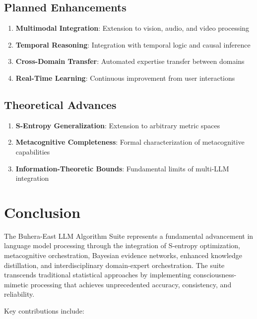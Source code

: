 \documentclass[12pt,a4paper]{article}
\begin{document}
\subsection{Planned Enhancements}

\begin{enumerate}
\item \textbf{Multimodal Integration}: Extension to vision, audio, and video processing
\item \textbf{Temporal Reasoning}: Integration with temporal logic and causal inference
\item \textbf{Cross-Domain Transfer}: Automated expertise transfer between domains
\item \textbf{Real-Time Learning}: Continuous improvement from user interactions
\end{enumerate}

\subsection{Theoretical Advances}

\begin{enumerate}
\item \textbf{S-Entropy Generalization}: Extension to arbitrary metric spaces
\item \textbf{Metacognitive Completeness}: Formal characterization of metacognitive capabilities
\item \textbf{Information-Theoretic Bounds}: Fundamental limits of multi-LLM integration
\end{enumerate}

\section{Conclusion}

The Buhera-East LLM Algorithm Suite represents a fundamental advancement in language model processing through the integration of S-entropy optimization, metacognitive orchestration, Bayesian evidence networks, enhanced knowledge distillation, and interdisciplinary domain-expert orchestration. The suite transcends traditional statistical approaches by implementing consciousness-mimetic processing that achieves unprecedented accuracy, consistency, and reliability.

Key contributions include:
\end{document}
